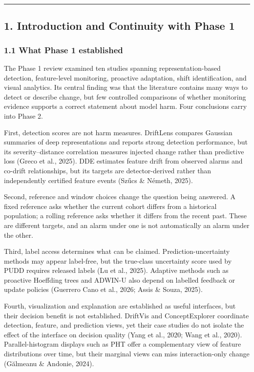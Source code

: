 \documentclass[
]{article}
\begin{document}
\begin{center}\rule{0.5\linewidth}{0.5pt}\end{center}

\hypertarget{introduction-and-continuity-with-phase-1}{%
\subsection{1. Introduction and Continuity with Phase
1}\label{introduction-and-continuity-with-phase-1}}

\hypertarget{what-phase-1-established}{%
\subsubsection{1.1 What Phase 1
established}\label{what-phase-1-established}}

The Phase 1 review examined ten studies spanning representation-based
detection, feature-level monitoring, proactive adaptation, shift
identification, and visual analytics. Its central finding was that the
literature contains many ways to detect or describe change, but few
controlled comparisons of whether monitoring evidence supports a correct
statement about model harm. Four conclusions carry into Phase 2.

First, detection scores are not harm measures. DriftLens compares
Gaussian summaries of deep representations and reports strong detection
performance, but its severity--distance correlation measures injected
change rather than predictive loss (Greco et al., 2025). DDE estimates
feature drift from observed alarms and co-drift relationships, but its
targets are detector-derived rather than independently certified feature
events (Szűcs \& Németh, 2025).

Second, reference and window choices change the question being answered.
A fixed reference asks whether the current cohort differs from a
historical population; a rolling reference asks whether it differs from
the recent past. These are different targets, and an alarm under one is
not automatically an alarm under the other.

Third, label access determines what can be claimed.
Prediction-uncertainty methods may appear label-free, but the true-class
uncertainty score used by PUDD requires released labels (Lu et al.,
2025). Adaptive methods such as proactive Hoeffding trees and ADWIN-U
also depend on labelled feedback or update policies (Guerrero Cano et
al., 2026; Assis \& Souza, 2025).

Fourth, visualization and explanation are established as useful
interfaces, but their decision benefit is not established. DriftVis and
ConceptExplorer coordinate detection, feature, and prediction views, yet
their case studies do not isolate the effect of the interface on
decision quality (Yang et al., 2020; Wang et al., 2020).
Parallel-histogram displays such as PHT offer a complementary view of
feature distributions over time, but their marginal views can miss
interaction-only change (Gălmeanu \& Andonie, 2024).
\end{document}
